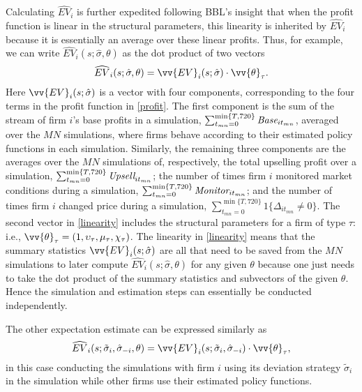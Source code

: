 \documentclass[11pt]{article}
\newcommand{\Base}{\mbox{\it Base}}
\newcommand{\Upsell}{\mbox{\it Upsell}}
\newcommand{\Monitor}{\mbox{\it Monitor}}
\begin{document}
Calculating $\widehat{EV}_i$ is further expedited following BBL's
insight that when the profit function is linear in the structural
parameters, this linearity is inherited by $\widehat{EV}_i$ because it
is essentially an average over these linear profits. Thus, for
example, we can write $\widehat{EV}_i (s;\hat{\sigma},\theta)$ as the
dot product of two vectors
\begin{equation}
\label{linearity}
\widehat{EV}_i (s;\hat{\sigma},\theta) = \vv{EV}_i(s;\hat{\sigma})
\cdot \vv{\theta}_{\tau}.
\end{equation}
Here $\vv{EV}_i(s;\hat{\sigma})$ is a vector with four components,
corresponding to the four terms in the profit function in
\eqref{profit}. The first component is the sum of the stream of firm
$i$'s base profits in a simulation, $\sum_{t_{mn}=0}^{\min\{T,720\}}
\Base_{it_{mn}}$, averaged over the $MN$ simulations, where firms
behave according to their estimated policy functions in each
simulation. Similarly, the remaining three components are the averages
over the $MN$ simulations of, respectively, the total upselling profit
over a simulation, $\sum_{t_{mn}=0}^{\min\{T,720\}}
\Upsell_{it_{mn}}$; the number of times firm $i$ monitored market
conditions during a simulation, $\sum_{t_{mn}=0}^{\min\{T,720\}}
\Monitor_{it_{mn}}$; and the number of times firm $i$ changed price
during a simulation, $\sum_{t_{mn}=0}^{\min\{T,720\}}
1\{\Delta_{it_{mn}} \neq 0\}$. The second vector in \eqref{linearity}
includes the structural parameters for a firm of type $\tau$: i.e.,
$\vv{\theta}_{\tau} = (1, \upsilon_{\tau}, \mu_{\tau}, \chi_{\tau})$.
The linearity in \eqref{linearity} means that the summary statistics
$\vv{EV}_i(s;\hat{\sigma})$ are all that need to be saved from the
$MN$ simulations to later compute $\widehat{EV}_i
(s;\hat{\sigma},\theta)$ for any given $\theta$ because one just needs
to take the dot product of the summary statistics and subvectors of
the given $\theta$. Hence the simulation and estimation steps can
essentially be conducted independently.

The other expectation estimate can be expressed similarly as
\begin{equation}
\label{linearity2}
\widehat{EV}_i (s;\tilde{\sigma}_i, \hat{\sigma}_{-i}, \theta ) =
\vv{EV}_i(s; \tilde{\sigma}_i, \hat{\sigma}_{-i}) \cdot
\vv{\theta}_{\tau},
\end{equation}
in this case conducting the simulations with firm $i$ using its
deviation strategy $\tilde{\sigma}_i$ in the simulation while other
firms use their estimated policy functions.
\end{document}
